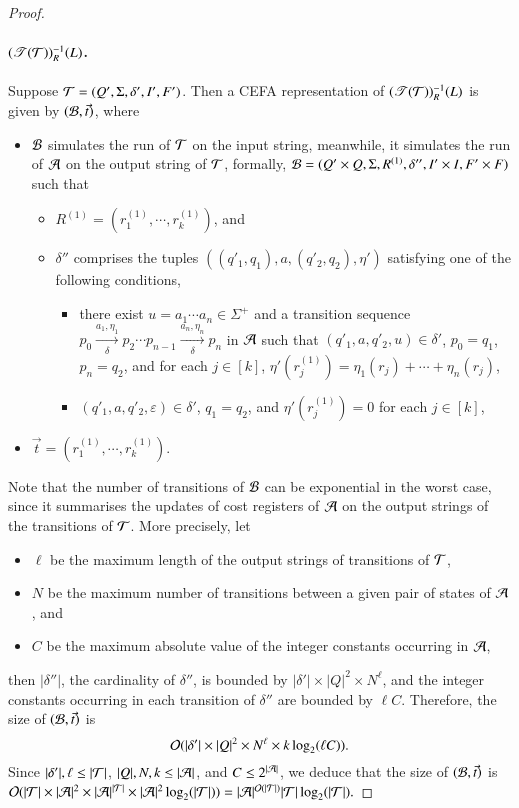 \begin{proof}
	\paragraph*{$(\mathscr{T}(\mathcal{T}))^{-1}_R(L)$.}
	Suppose $\mathcal{T} = (Q', \Sigma, \delta', I', F')$. Then a CEFA representation of $(\mathscr{T}(\mathcal{T}))^{-1}_R(L)$ is given by 
	$(\mathcal{B}, \vec{t})$, where 
	\begin{itemize}
		\item $\mathcal{B}$ simulates the run of $\mathcal{T}$ on the input string, meanwhile, it simulates the run of $\mathcal{A}$ on the output string of $\mathcal{T}$, formally, $\mathcal{B}= (Q' \times Q, \Sigma, R^{(1)}, \delta'', I' \times I, F' \times F)$ such that 
		\begin{itemize}
			\item $R^{(1)}  = (r^{(1)}_1, \cdots, r^{(1)}_k)$, and
			\item $\delta''$ comprises the tuples $((q'_1, q_1), a, (q'_2, q_2), \eta')$ satisfying one of the following conditions,
			\begin{itemize}
				\item there exist $u = a_1 \cdots a_n \in \Sigma^+$ and a transition sequence $p_0 \xrightarrow[\delta]{a_1, \eta_1} p_2 \cdots p_{n-1} \xrightarrow[\delta]{a_n, \eta_n} p_{n}$ in $\mathcal{A}$ such that $(q'_1, a, q'_2, u) \in \delta'$, $p_0 = q_1$, $p_{n}= q_2$, and for each $j \in [k]$,  $\eta'(r^{(1)}_j) = \eta_1(r_j) + \cdots + \eta_n(r_j)$,
				\item $(q'_1, a, q'_2, \varepsilon) \in \delta'$, $q_1 = q_2$, and $\eta'(r^{(1)}_j) =0$ for each $j \in [k]$,
			\end{itemize}
		\end{itemize}
		\item $\vec{t}=(r^{(1)}_1, \cdots, r^{(1)}_k)$.
	\end{itemize}
	Note that the number of transitions of $\mathcal{B}$ can be exponential in the worst case, since it summarises the updates of cost registers of $\mathcal{A}$ on the output strings of the transitions of $\mathcal{T}$. More precisely,  let
	\begin{itemize}
		\item $\ell$ be the maximum length of the output strings of transitions of $\mathcal{T}$, 
		\item $N$ be the maximum number of transitions between a given pair of states of $\mathcal{A}$, and
		\item  $C$ be the maximum absolute value of the integer constants occurring in $\mathcal{A}$,
	\end{itemize}
	then $|\delta''|$, the cardinality of $\delta''$, is bounded by $|\delta'| \times |Q|^2 \times N^\ell $, and the integer constants occurring in each transition of $\delta''$ are bounded by $\ell C$. Therefore, 
	the size of $(\mathcal{B}, \vec{t})$ is 
	\[
	\mathcal{O}(|\delta'| \times |Q|^2 \times N^\ell \times k \log_2 (\ell C)).
	\] 
	Since $|\delta'|, \ell \le |\mathcal{T}|$, $|Q|, N, k \le |\mathcal{A}|$, and $C \le 2^{|\mathcal{A}|}$, we deduce that the size of $(\mathcal{B}, \vec{t})$ is 
	$
	\mathcal{O}( |\mathcal{T}| \times  |\mathcal{A}|^2 \times |\mathcal{A}|^{|\mathcal{T}|} \times |\mathcal{A}|^2 \log_2(|\mathcal{T}|))= |\mathcal{A}|^{\mathcal{O}(|\mathcal{T}|)} |\mathcal{T}| \log_2(|\mathcal{T}|).$
	

\end{proof}
